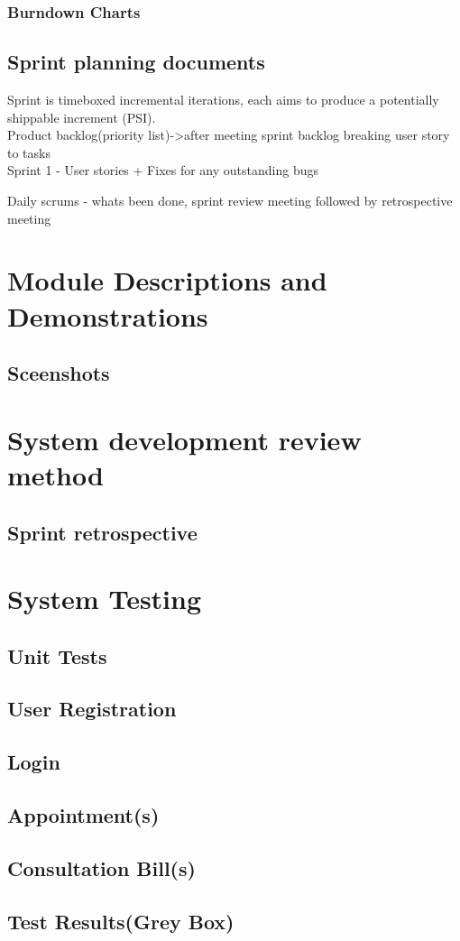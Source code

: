 \documentclass[11 pt]{article}
\begin{document}
  \subsubsection{Burndown Charts}
  

\subsection{Sprint planning documents}

Sprint is timeboxed incremental iterations, each aims to produce a potentially shippable increment (PSI).\\
Product backlog(priority list)->after meeting sprint backlog breaking user story to tasks \\
Sprint 1 - User stories + Fixes for any outstanding bugs

Daily scrums - whats been done, sprint review meeting
followed by retrospective meeting

\section{Module Descriptions and Demonstrations} 
\subsection{Sceenshots}
\section{System development review method} 
\subsection{Sprint retrospective}
\section{System Testing}
\subsection{Unit Tests}
\subsection*{User Registration}
\subsection*{Login}
\subsection*{Appointment(s)}
\subsection*{Consultation Bill(s)}
\subsection{Test Results(Grey Box)} 
 
\end{document}
